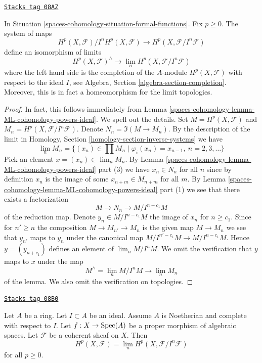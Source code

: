 \begin{theorem}

\label{spaces-cohomology-theorem-formal-functions}
\href{https://stacks.math.columbia.edu/tag/08AZ}{\texttt{Stacks tag 08AZ}}

In Situation \ref{spaces-cohomology-situation-formal-functions}. Fix $p \geq 0$.
The system of maps
$$
H^p(X, \mathcal{F})/I^nH^p(X, \mathcal{F})
\longrightarrow
H^p(X, \mathcal{F}/I^n\mathcal{F})
$$
define an isomorphism of limits
$$
H^p(X, \mathcal{F})^\wedge
\longrightarrow
\lim_n H^p(X, \mathcal{F}/I^n\mathcal{F})
$$
where the left hand side is the completion of the $A$-module
$H^p(X, \mathcal{F})$ with respect to the ideal $I$, see
Algebra, Section \ref{algebra-section-completion}.
Moreover, this is in fact a homeomorphism for the limit topologies.
\end{theorem}

\begin{proof}
In fact, this follows immediately from
Lemma \ref{spaces-cohomology-lemma-ML-cohomology-powers-ideal}. We spell out the details.
Set $M = H^p(X, \mathcal{F})$ and $M_n = H^p(X, \mathcal{F}/I^n\mathcal{F})$.
Denote $N_n = \Im(M \to M_n)$.
By the description of the limit in Homology, Section
\ref{homology-section-inverse-systems} we have
$$
\lim_n M_n
=
\{(x_n) \in \prod M_n \mid \varphi_i(x_n) = x_{n - 1}, \ n = 2, 3, \ldots\}
$$
Pick an element $x = (x_n) \in \lim_n M_n$.
By Lemma \ref{spaces-cohomology-lemma-ML-cohomology-powers-ideal} part (3)
we have $x_n \in N_n$ for all $n$ since by
definition $x_n$ is the image of some $x_{n + m} \in M_{n + m}$ for
all $m$. By Lemma \ref{spaces-cohomology-lemma-ML-cohomology-powers-ideal} part (1)
we see that there exists a factorization
$$
M \to N_n \to M/I^{n - c_1}M
$$
of the reduction map. Denote $y_n \in M/I^{n - c_1}M$ the image of $x_n$
for $n \geq c_1$. Since for $n' \geq n$ the composition
$M \to M_{n'} \to M_n$ is the given map $M \to M_n$ we see that
$y_{n'}$ maps to $y_n$ under the canonical map
$M/I^{n' - c_1}M \to M/I^{n - c_1}M$. Hence $y = (y_{n + c_1})$
defines an element of $\lim_n M/I^nM$.
We omit the verification that $y$ maps to $x$ under the
map
$$
M^\wedge = \lim_n M/I^nM \longrightarrow \lim_n M_n
$$
of the lemma. We also omit the verification on topologies.
\end{proof}

\begin{lemma}
\label{spaces-cohomology-lemma-spell-out-theorem-formal-functions}
\href{https://stacks.math.columbia.edu/tag/08B0}{\texttt{Stacks tag 08B0}}

Let $A$ be a ring. Let $I \subset A$ be an ideal. Assume $A$ is
Noetherian and complete with respect to $I$.
Let $f : X \to \operatorname{Spec}(A)$ be a proper morphism of algebraic spaces.
Let $\mathcal{F}$ be a coherent sheaf on $X$. Then
$$
H^p(X, \mathcal{F}) = \lim_n H^p(X, \mathcal{F}/I^n\mathcal{F})
$$
for all $p \geq 0$.
\end{lemma}

